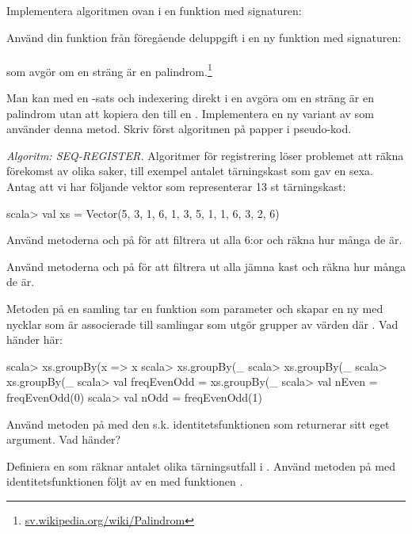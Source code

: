 \Subtask Implementera algoritmen ovan i en funktion med signaturen: \\

\Subtask Använd din funktion  från föregående deluppgift i en ny funktion med signaturen:\\
  \\ som avgör om en sträng är en palindrom.\footnote{\href{https://sv.wikipedia.org/wiki/Palindrom}{sv.wikipedia.org/wiki/Palindrom}} 

\Subtask\Pen Man kan med en -sats och indexering direkt i en  avgöra om en sträng är en palindrom utan att kopiera den till en . Implementera en ny variant av  som använder denna metod. Skriv först algoritmen på papper i pseudo-kod.

\Task \label{task:seq-reg} \emph{Algoritm: SEQ-REGISTER.} Algoritmer för registrering löser problemet att räkna förekomst av olika saker, till exempel antalet tärningskast som gav en sexa. Antag att vi har följande vektor  som representerar 13 st tärningskast:
\begin{REPL}
scala> val xs =  Vector(5, 3, 1, 6, 1, 3, 5, 1, 1, 6, 3, 2, 6)
\end{REPL}
\Subtask Använd metoderna  och  på  för att filtrera ut alla 6:or och räkna hur många de är.

\Subtask Använd metoderna  och  på  för att filtrera ut alla jämna kast och räkna hur många de är.

\Subtask Metoden  på en samling tar en funktion  som parameter och skapar en ny  med nycklar  som är associerade till samlingar som utgör grupper av värden där 
.  Vad händer här:
\begin{REPL}
scala> xs.groupBy(x => x %
scala> xs.groupBy(_ %
scala> xs.groupBy(_ %
scala> xs.groupBy(_ %
scala> val freqEvenOdd = xs.groupBy(_ %
scala> val nEven = freqEvenOdd(0)
scala> val nOdd = freqEvenOdd(1)
\end{REPL}
\Subtask Använd metoden  på  med den s.k. identitetsfunktionen  som returnerar sitt eget argument. Vad händer? 

\Subtask Definiera en  som räknar antalet olika tärningsutfall i . Använd metoden  på  med identitetsfunktionen följt av en  med funktionen .

